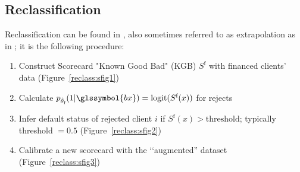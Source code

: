\subsection{Reclassification} \label{reclassification}

Reclassification can be found in \cite{RI6}, also sometimes referred to as extrapolation as in \cite{banasik}; it is the following procedure:
\begin{enumerate}
\item Construct Scorecard "Known Good Bad" (KGB) $S^{\text{f}}$ with financed clients' data (Figure~\ref{reclass:sfig1})
\item Calculate $p_{\hat{\theta}_{\text{f}}}(1|\glssymbol{bx}) = \text{logit}(S^{\text{f}}(x))$ for rejects
\item Infer default status of rejected client $i$ if $S^{\text{f}}(x) > \text{threshold}$; typically threshold $=0.5$ (Figure~\ref{reclass:sfig2})
\item Calibrate a new scorecard with the ‘‘augmented'' dataset (Figure~\ref{reclass:sfig3})
\end{enumerate}

